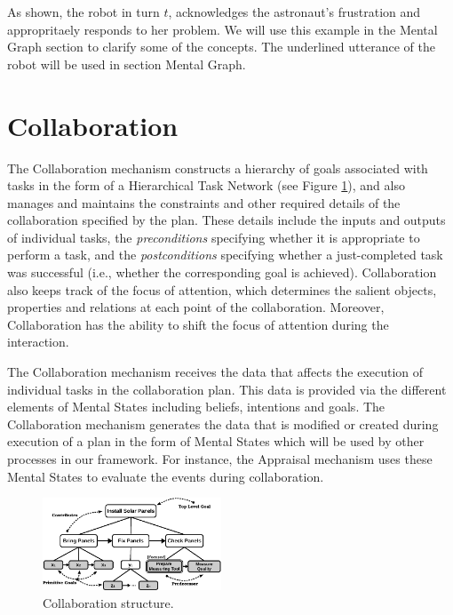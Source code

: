 \documentclass[letterpaper]{article}
\begin{document}
\vspace*{-1mm}
As shown, the robot in turn $t$, acknowledges the astronaut's frustration and
appropritaely responds to her problem. We will use this example in the Mental
Graph section to clarify some of the concepts. The underlined utterance of the
robot will be used in section Mental Graph.

\section{Collaboration}

The Collaboration mechanism constructs a hierarchy of goals associated with
tasks in the form of a Hierarchical Task Network (see Figure \ref{fig:cs}), and
also manages and maintains the constraints and other required details of the
collaboration specified by the plan. These details include the inputs and
outputs of individual tasks, the \textit{preconditions} specifying whether it is
appropriate to perform a task, and the \textit{postconditions} specifying
whether a just-completed task was successful (i.e., whether the corresponding
goal is achieved). Collaboration also keeps track of the focus of attention,
which determines the salient objects, properties and relations at each point of
the collaboration. Moreover, Collaboration has the ability to shift the focus of
attention during the interaction. 

The Collaboration mechanism receives the data that affects the execution of
individual tasks in the collaboration plan. This data is provided via the
different elements of Mental States including beliefs, intentions and goals.
The Collaboration mechanism generates the data that is modified or created
during execution of a plan in the form of Mental States which will be used by
other processes in our framework. For instance, the Appraisal mechanism uses
these Mental States to evaluate the events during collaboration.

\vspace*{-2mm}
\begin{figure}[tbh]
  \centering
  \includegraphics[width=0.474\textwidth]{figure/collaborationStructure-croped.pdf}
  \caption{{\fontsize{9}{9}\selectfont Collaboration structure.}}
  \label{fig:cs}
\end{figure}
\end{document}
